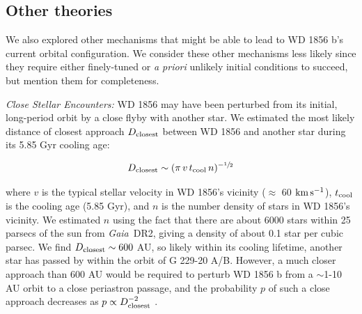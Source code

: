 \documentclass{nature3}
\newcommand{\project}[1]{\textsl{#1}}
\newcommand{\Gaia}{\project{Gaia}}
\newcommand{\kms}{\ensuremath{\rm km\,s^{-1}}}
\begin{document}
\begin{methods}
\subsection{Other theories}
We also explored other mechanisms that might be able to lead to WD 1856 b's current orbital configuration. We consider these other mechanisms less likely since they require either finely-tuned or \textit{a priori} unlikely initial conditions to succeed, but mention them for completeness. 

\textit{Close Stellar Encounters: } WD 1856 may have been perturbed from its initial, long-period orbit by a close flyby with another star. We estimated the most likely distance of closest approach $D_{\rm closest}$ between WD 1856 and another star during its 5.85 Gyr cooling age: 

\begin{equation}
    D_{\rm closest} \sim (\pi\,v\,t_{\rm cool}\,n)^{-\sfrac{1}{2}}
\end{equation}

\noindent where $v$ is the typical stellar velocity in WD 1856's vicinity ($\approx$ 60 \kms), $t_{\rm cool}$ is the cooling age (5.85 Gyr), and $n$ is the number density of stars in WD 1856's vicinity. We estimated $n$ using the fact that there are about 6000 stars within 25 parsecs of the sun from \Gaia\ DR2, giving a density of about 0.1 star per cubic parsec. We find $D_{\rm closest}\sim 600$ AU, so likely within its cooling lifetime, another star has passed by within the orbit of G 229-20 A/B. However, a much closer approach than 600 AU would be required to perturb WD 1856 b from a $\sim$1-10 AU orbit to a close periastron passage, and the probability $p$ of such a close approach decreases as $p\propto D_{\rm closest}^{-2}$ . 


\end{methods}
\end{document}
